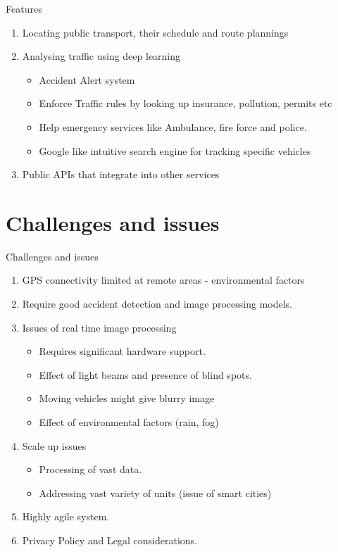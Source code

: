 \documentclass{beamer}
\begin{document}
\begin{frame}{Features}
	\begin{enumerate}
		\item Locating public transport, their schedule and route plannings
		\item Analysing traffic using deep learning
		\begin{itemize}
		    \item Accident Alert system
		    \item Enforce Traffic rules by looking up insurance, pollution, permits etc
		    \item Help emergency services like Ambulance, fire force and police.
		    \item Google like intuitive search engine for tracking specific vehicles
		\end{itemize}
		\item Public APIs that integrate into other services
	\end{enumerate}
\end{frame}

\section{Challenges and issues}
\begin{frame}{Challenges and issues}
	\begin{enumerate}
	    \item GPS connectivity limited at remote areas - environmental factors
		\item Require good accident detection and image processing models.
		\item Issues of real time image processing
		\begin{itemize}
		    \item Requires significant hardware support.	
		    \item Effect of light beams and presence of blind spots.
			\item Moving vehicles might give blurry image
			\item Effect of environmental factors (rain, fog)
		\end{itemize}
		\item Scale up issues
		\begin{itemize}
			\item Processing of vast data.
			\item Addressing vast variety of units (issue of smart cities)
		\end{itemize}
		\item Highly agile system.
		\item Privacy Policy and Legal considerations.
	\end{enumerate}
\end{frame}
\end{document}

